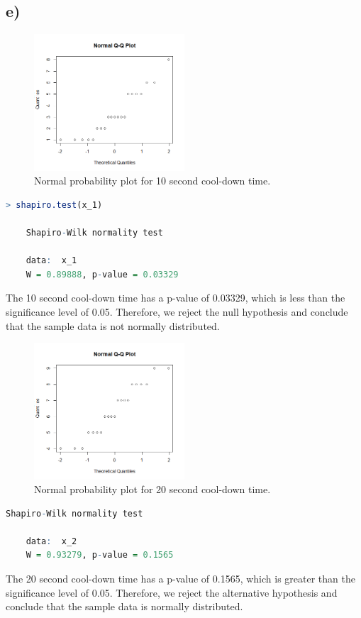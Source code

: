 \documentclass{article}
\begin{document}
\subsection*{e)}
\begin{figure}[h]
    \centering
    \includegraphics[width=0.5\textwidth]{./hw_1/images/norm_1.png}
    \caption{Normal probability plot for 10 second cool-down time.}
    \label{fig:4_a}
  \end{figure}
  \begin{lstlisting}[language=R, caption=Shapiro-Wilk normality test for 10 second cool-down time., basicstyle=\small]
    > shapiro.test(x_1)

	Shapiro-Wilk normality test

    data:  x_1
    W = 0.89888, p-value = 0.03329
    \end{lstlisting}
    The 10 second cool-down time has a p-value of 0.03329, which is less than the significance level of 0.05. Therefore, we reject the null hypothesis and conclude that the sample data is not normally distributed.
  \begin{figure}[h]
    \centering
    \includegraphics[width=0.5\textwidth]{./hw_1/images/norm_2.png}
    \caption{Normal probability plot for 20 second cool-down time.}
    \label{fig:4_a}
  \end{figure}
  \begin{lstlisting}[language=R, caption=Shapiro-Wilk normality test for 20 second cool-down time., basicstyle=\small]
	Shapiro-Wilk normality test

    data:  x_2
    W = 0.93279, p-value = 0.1565
    \end{lstlisting}
    The 20 second cool-down time has a p-value of 0.1565, which is greater than the significance level of 0.05. Therefore, we reject the alternative hypothesis and conclude that the sample data is normally distributed.
\end{document}

